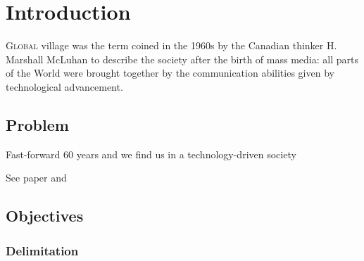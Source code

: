 \chapter{Introduction}
\label{chap:intro}

\lettrine[lines=3, findent=3pt, nindent=0pt]{G}{lobal} village was the term coined in the 1960s by the Canadian thinker H. Marshall McLuhan \cite{mcluhan1962} to describe the society after the birth of mass media: all parts of the World were brought together by the communication abilities given by technological advancement. \\





\section{Problem}
\label{sec:problem}

Fast-forward 60 years and we find us in a technology-driven society

See paper \cite{lallie2020cyber} and \cite{Lin2018}
\lipsum[1-3]


\section{Objectives}
\label{sec:objectives}

\lipsum[1-2]


\subsection{Delimitation}
\label{subsec:delimitation}

\lipsum[1]

